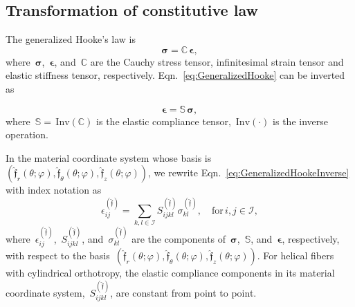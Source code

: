 \documentclass[preprint,12pt,times]{elsarticle}
\numberwithin{equation}{section}
\newcommand{\physf}{\hat{\boldsymbol{\mathfrak{f}}}}
\renewcommand{\u}[1]{\boldsymbol{#1}}
\newcommand{\usf}[1]{\u{\mathsf #1}}
\newcommand{\pr}[1]{\left( #1 \right)}
\newcommand{\Inv}{\,\mathrm{Inv}}
\renewcommand{\>}{$\Rightarrow$}
\begin{document}
\subsection{Transformation of constitutive law}
\label{sec:MatrixTrans}
The generalized Hooke's law is
\begin{equation}
\u{\sigma} = \mathbb{C}\, \u{\epsilon},
\label{eq:GeneralizedHooke}
\end{equation}
where~$\u{\sigma}$,~$\u{\epsilon}$, and~$\mathbb{C}$ are the Cauchy stress tensor, infinitesimal strain tensor and elastic stiffness tensor, respectively. Eqn.~\eqref{eq:GeneralizedHooke} can be inverted as

\begin{equation}
 \u{\epsilon} = \mathbb{S}\, \u{\sigma},
\label{eq:GeneralizedHookeInverse}
\end{equation}
where~$\mathbb{S} = \Inv\pr{\mathbb{C}}$ is the elastic compliance tensor, $\Inv\pr{\cdot}$ is the inverse operation.

In the material coordinate system whose basis is~$\pr{\physf_{r}(\theta;\varphi),\physf_{\theta}(\theta;\varphi),\physf_{z}(\theta;\varphi)}$, we rewrite Eqn.~\eqref{eq:GeneralizedHookeInverse} with index notation as
\begin{equation}
\epsilon_{ij}^{\pr{\physf}} = \sum_{k,l \in \mathcal{I}}  S_{ijkl}^{\pr{\physf}} \sigma_{kl}^{\pr{\physf}}, \quad \text{for} \,i,j \in \mathcal{I} ,
\label{eq:GeneralizedHookeComponents}
\end{equation}
where~$\epsilon_{ij}^{\pr{\physf}}$,~$S_{ijkl}^{\pr{\physf}}$, and~$\sigma_{kl}^{\pr{\physf}}$ are the components of~$\u{\sigma}$,~$\mathbb{S}$, and~$\u{\epsilon}$, respectively, with respect to the basis~$\pr{\physf_{r}(\theta;\varphi),\physf_{\theta}(\theta;\varphi),\physf_{z}(\theta;\varphi)}$. For helical fibers with cylindrical orthotropy, the elastic compliance components in its material coordinate system,~$S_{ijkl}^{\pr{\physf}}$, are constant from point to point.


\end{document}
